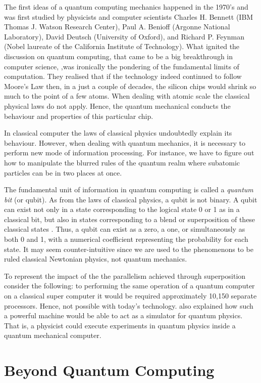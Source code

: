 \documentclass[twoside,11pt]{article}
\begin{document}
The first ideas of a quantum computing mechanics happened in the 1970's and was first studied by physicists and computer scientists 
Charles H. Bennett (IBM Thomas J. Watson Research Center), 
Paul A. Benioff (Argonne National Laboratory),
David Deutsch (University of Oxford),
and Richard P. Feynman (Nobel laureate of the California Institute of Technology).
What ignited the discussion on quantum computing, that came to be a big breakthrough in computer science, ,was ironically the pondering of the fundamental limits of computation.
They realised that if  the technology indeed continued to follow Moore's Law then, in a just a couple of decades, the silicon chips would shrink so much to the point of a few atoms.
When dealing with atomic scale the classical physical laws do not apply.
Hence, the quantum mechanical conducts the behaviour and properties of this particular chip.

In classical computer the laws of classical physics undoubtedly explain its behaviour.
However, when dealing with quantum mechanics, it is necessary to perform new mode of information processing.
For instance, we have to figure out how to manipulate the blurred rules of the quantum realm where subatomic particles can be in two places at once. 


The fundamental unit of information in quantum computing is called a \emph{quantum bit} (or qubit).
As from the laws of classical physics, a qubit is not binary.
A qubit can exist not only in a state corresponding to the logical state 0 or 1 as in a classical bit, but also in states corresponding to a blend or superposition of these classical states \citep{thedg}.
Thus, a qubit can exist as a zero, a one, or simultaneously as both 0 and 1, with a numerical coefficient representing the probability for each state. 
It may seem counter-intuitive since we are used to the phenomenons to be ruled classical Newtonian physics, not quantum mechanics.

To represent the impact of the the parallelism achieved through superposition consider the following: to performing the same operation of a quantum computer on a classical super computer it would be required  approximately 10,150 separate processors.
Hence, not possible with today's technology.
\cite{feynman1982simulating} also explained how such a powerful machine would be able to act as a simulator for quantum physics. 
That is, a physicist could execute experiments in quantum physics inside a quantum mechanical computer.

\section{Beyond Quantum Computing}
\label{sec:bey}
\end{document}
